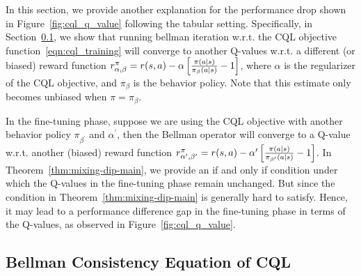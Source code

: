 In this section, we provide another explanation for the performance drop shown in Figure~\ref{fig:cql_q_value} following the tabular setting. Specifically, in Section~\ref{subsec:reward-bias}, we show that running bellman iteration w.r.t. the CQL objective function~\eqref{eqn:cql_training} will converge to another Q-values w.r.t. a different (or biased) reward function $r^\pi_{\alpha,\beta}=r(s,a) - \alpha\left[  \frac{\pi(a|s)}{\pi_\beta(a|s)} - 1  \right]$, where $\alpha$ is the regularizer of the CQL objective, and $\pi_\beta$ is the behavior policy. Note that this estimate only becomes unbiased when $\pi=\pi_\beta$.

In the fine-tuning phase, suppose we are using the CQL objective with another behavior policy $\pi_{\beta^\prime}$ and $\alpha^\prime$, then the Bellman operator will converge to a Q-value w.r.t. another (biased) reward function $r^\pi_{\alpha^\prime,\beta^\prime}=r(s,a) - \alpha^\prime\left[  \frac{\pi(a|s)}{\pi_{\beta^\prime}(a|s)} - 1  \right]$. In Theorem~\ref{thm:mixing-dip-main}, we provide an if and only if condition under which the Q-values in the fine-tuning phase remain unchanged. But since the condition in Theorem~\ref{thm:mixing-dip-main} is generally hard to satisfy. Hence, it may lead to a performance difference gap in the fine-tuning phase in terms of the Q-values, as observed in Figure~\ref{fig:cql_q_value}.

\subsection{Bellman Consistency Equation of CQL}
 
\label{subsec:reward-bias}


